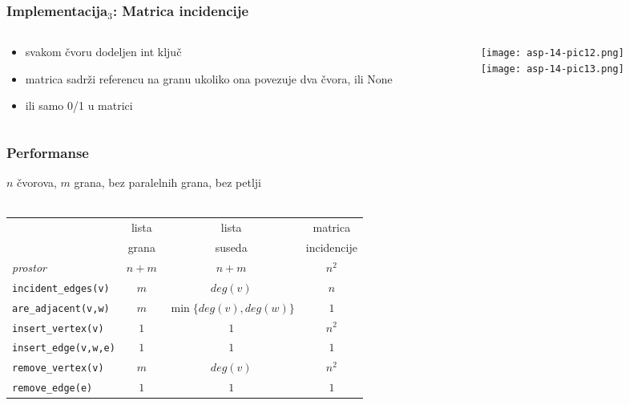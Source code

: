 \documentclass[compress,aspectratio=169]{beamer}
\begin{document}
\begin{frame}[fragile]
  \frametitle{Implementacija$_3$: Matrica incidencije}
  \begin{columns}
    \begin{column}[t]{6cm}
      \begin{itemize}
        \item svakom čvoru dodeljen int ključ
        \item matrica sadrži referencu na granu ukoliko ona povezuje
          dva čvora, ili None
        \item ili samo 0/1 u matrici
      \end{itemize}
    \end{column}
    \begin{column}[t]{6cm}
      \begin{center}
        \texttt{[image: asp-14-pic12.png]} \\
        \texttt{[image: asp-14-pic13.png]}
      \end{center}
    \end{column}
  \end{columns}
\end{frame}

\begin{frame}[fragile]
  \frametitle{Performanse}
    $n$ čvorova, $m$ grana, bez paralelnih grana, bez petlji \\ \ \\
  \begin{tabular}{l|c|c|c}
     & lista & lista & matrica \\
     & grana & suseda & incidencije \\ \hline     
    \textit{prostor} & $n+m$ & $n+m$ & $n^2$ \\ \hline
    \texttt{incident\_edges(v)} & $m$ & $deg(v)$ & $n$ \\ \hline
    \texttt{are\_adjacent(v,w)} & $m$ & $\min\{deg(v),deg(w)\}$ & $1$ \\ \hline
    \texttt{insert\_vertex(v)} & $1$ & $1$ & $n^2$ \\ \hline
    \texttt{insert\_edge(v,w,e)} & $1$ & $1$ & $1$ \\ \hline
    \texttt{remove\_vertex(v)} & $m$ & $deg(v)$ & $n^2$ \\ \hline
    \texttt{remove\_edge(e)} & $1$ & $1$ & $1$ \\
  \end{tabular}
\end{frame}
\end{document}
